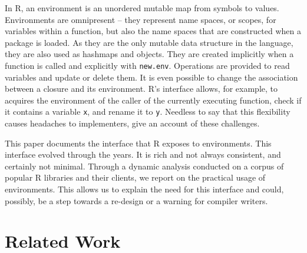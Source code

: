 \documentclass[sigplan,screen]{acmart}
\renewcommand{\c}[1]{\lstinline |#1|\xspace}
\begin{document}
In R, an environment is an unordered mutable map from symbols to values.
Environments are omnipresent -- they represent name spaces, or scopes, for
variables within a function, but also the name spaces that are constructed when
a package is loaded. As they are the only mutable data structure in the language,
they are also used as hashmaps and objects. They are created implicitly when a
function is called and explicitly with \c{new.env}. Operations are provided to
read variables and update or delete them. It is even possible to change the
association between a closure and its environment. R's interface allows, for
example, to acquires the environment of the caller of the currently executing
function, check if it contains a variable \c{x}, and rename it to \c{y}.
Needless to say that this flexibility causes headaches to implementers,
\citet{dls19} give an account of these challenges.

This paper documents the interface that R exposes to environments. This
interface evolved through the years. It is rich and not always consistent, and
certainly not minimal. Through a dynamic analysis conducted on a corpus of
popular R libraries and their clients, we report on the practical usage of
environments. This allows us to explain the need for this interface and could,
possibly, be a step towards a re-design or a warning for compiler writers.

\section{Related Work}
\end{document}
